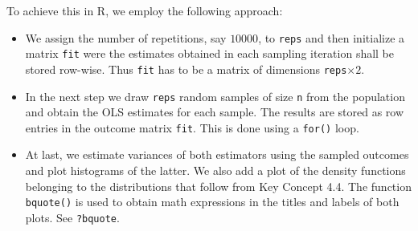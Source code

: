 \documentclass[]{book}
\newenvironment{Shaded}{\begin{snugshade}}{\end{snugshade}}
\newcommand{\KeywordTok}[1]{\textcolor[rgb]{0.13,0.29,0.53}{\textbf{#1}}}
\newcommand{\DataTypeTok}[1]{\textcolor[rgb]{0.13,0.29,0.53}{#1}}
\newcommand{\DecValTok}[1]{\textcolor[rgb]{0.00,0.00,0.81}{#1}}
\newcommand{\StringTok}[1]{\textcolor[rgb]{0.31,0.60,0.02}{#1}}
\newcommand{\CommentTok}[1]{\textcolor[rgb]{0.56,0.35,0.01}{\textit{#1}}}
\newcommand{\ControlFlowTok}[1]{\textcolor[rgb]{0.13,0.29,0.53}{\textbf{#1}}}
\newcommand{\OperatorTok}[1]{\textcolor[rgb]{0.81,0.36,0.00}{\textbf{#1}}}
\newcommand{\NormalTok}[1]{#1}
\providecommand{\tightlist}{%
  \setlength{\itemsep}{0pt}\setlength{\parskip}{0pt}}
\theoremstyle{definition}
\theoremstyle{definition}
\theoremstyle{definition}
\theoremstyle{remark}
\begin{document}
To achieve this in R, we employ the following approach:

\begin{itemize}
\tightlist
\item
  We assign the number of repetitions, say \(10000\), to \texttt{reps}
  and then initialize a matrix \texttt{fit} were the estimates obtained
  in each sampling iteration shall be stored row-wise. Thus \texttt{fit}
  has to be a matrix of dimensions \texttt{reps}\(\times2\).
\item
  In the next step we draw \texttt{reps} random samples of size
  \texttt{n} from the population and obtain the OLS estimates for each
  sample. The results are stored as row entries in the outcome matrix
  \texttt{fit}. This is done using a \texttt{for()} loop.
\item
  At last, we estimate variances of both estimators using the sampled
  outcomes and plot histograms of the latter. We also add a plot of the
  density functions belonging to the distributions that follow from Key
  Concept 4.4. The function \texttt{bquote()} is used to obtain math
  expressions in the titles and labels of both plots. See
  \texttt{?bquote}.
\end{itemize}

\begin{Shaded}
\end{Shaded}
\end{document}
